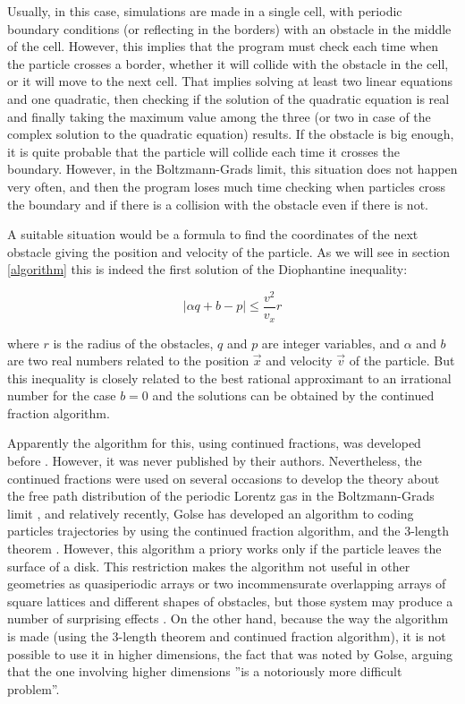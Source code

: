 \documentclass[prl,amsmath,amssymb, twocolumn, showpacs]{revtex4-1}
\begin{document}
Usually, in this case, simulations are made in a single cell, with periodic boundary conditions (or reflecting in the borders) with an obstacle in the middle of the cell\cite{sanders2008normal,  sanders2005fine}. However, this implies that the program must check each time when the particle crosses a border, whether it will collide with the obstacle in the cell, or it will move to the next cell. That implies solving at least two linear equations and one quadratic, then checking if the solution of the quadratic equation is real and finally taking the maximum value among the three (or two in case of the complex solution to the quadratic equation) results. If the obstacle is big enough, it is quite probable that the particle will collide each time it crosses the boundary. However, in the Boltzmann-Grads limit, this situation does not happen very often, and then the program loses much time checking when particles cross the boundary and if there is a collision with the obstacle even if there is not.

A suitable situation would be a formula to find the coordinates of the next obstacle giving the position and velocity of the particle. As we will see in section \ref{algorithm} this is indeed the first solution of the Diophantine inequality:

\begin{equation}
|\alpha q+b-p|\leq  \frac{v^2}{v_x} r
\end{equation}

where $r$ is the radius of the obstacles, $q$ and $p$ are integer variables, and $\alpha$ and $b$ are two real numbers related to the position $\vec{x}$ and velocity $\vec{v}$ of the particle. But this inequality is closely related to the best rational approximant to an irrational number for the case $b=0$ and the solutions can be obtained by the continued fraction algorithm. 

Apparently the algorithm for this, using continued fractions, was developed before \cite{zacherl1986power}. However, it was never published by their authors. Nevertheless, the continued fractions were used on several occasions to develop the theory about the free path distribution of the periodic Lorentz gas in the Boltzmann-Grads limit \cite{caglioti2003distribution, golse2012recent,boca2007distribution,golse2006periodic,caglioti2008boltzmann, caglioti2010boltzmann, golse2000distribution, bleher1992statistical,chernov1994statistical}, and relatively recently, Golse has developed an algorithm to coding particles trajectories by using the continued fraction algorithm, and the 3-length theorem \cite{golse2012recent}. However, this algorithm a priory works only if the particle leaves the surface of a disk. This restriction makes the algorithm not useful in other geometries as quasiperiodic arrays or two incommensurate overlapping arrays of square lattices and different shapes of obstacles, but those system may produce a number of surprising effects \cite{}.  On the other hand, because the way the algorithm is made (using the 3-length theorem and continued fraction algorithm), it is not possible to use it in higher dimensions, the fact that was noted by Golse, arguing that the one involving higher dimensions ''is a notoriously more difficult problem''.
\end{document}
